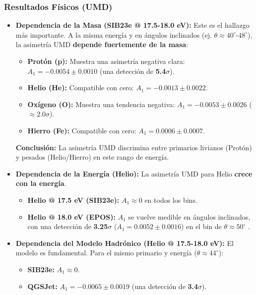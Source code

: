 \subsubsection*{Resultados Físicos (UMD)}

\begin{itemize}
	\item \textbf{Dependencia de la Masa (SIB23e @ 17.5-18.0 eV):}
	Este es el hallazgo más importante. A la misma energía y en ángulos inclinados (ej. $\theta \approx 40^\circ\text{-}48^\circ$), la asimetría UMD \textbf{depende fuertemente de la masa}:
	\begin{itemize}
		\item \textbf{Protón (p):} Muestra una asimetría negativa clara: $A_1 = -0.0054 \pm 0.0010$ (una detección de \textbf{5.4$\sigma$}).
		\item \textbf{Helio (He):} Compatible con cero: $A_1 = -0.0013 \pm 0.0022$.
		\item \textbf{Oxígeno (O):} Muestra una tendencia negativa: $A_1 = -0.0053 \pm 0.0026$ ($\approx 2.0\sigma$).
		\item \textbf{Hierro (Fe):} Compatible con cero: $A_1 = 0.0006 \pm 0.0007$.
	\end{itemize}
	\textbf{Conclusión:} La asimetría UMD discrimina entre primarios livianos (Protón) y pesados (Helio/Hierro) en este rango de energía.
	
	\item \textbf{Dependencia de la Energía (Helio):}
	La asimetría UMD para Helio \textbf{crece con la energía}.
	\begin{itemize}
		\item \textbf{Helio @ 17.5 eV (SIB23e):} $A_1 \approx 0$ en todos los bins.
		\item \textbf{Helio @ 18.0 eV (EPOS):} $A_1$ se vuelve medible en ángulos inclinados, con una detección de \textbf{3.25$\sigma$} ($A_1 = 0.0052 \pm 0.0016$) en el bin de $\theta \approx 50^\circ$ .
	\end{itemize}
	
	\item \textbf{Dependencia del Modelo Hadrónico (Helio @ 17.5-18.0 eV):}
	El modelo es fundamental. Para el mismo primario y energía ($\theta \approx 44^\circ$):
	\begin{itemize}
		\item \textbf{SIB23e:} $A_1 \approx 0$.
		\item \textbf{QGSJet:} $A_1 = -0.0065 \pm 0.0019$ (una detección de \textbf{3.4$\sigma$}).
	\end{itemize}
\end{itemize}

